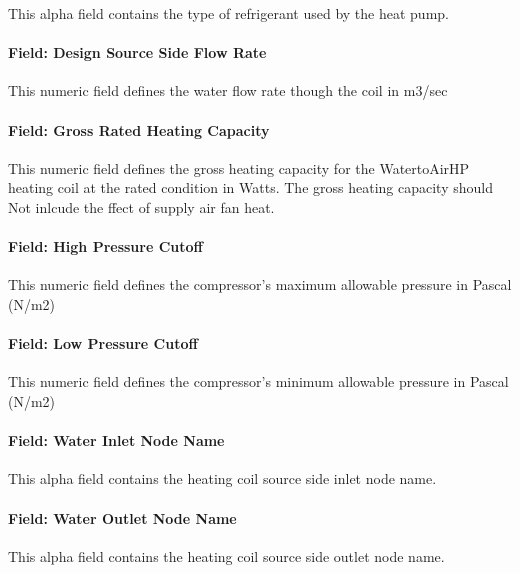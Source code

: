 This alpha field contains the type of refrigerant used by the heat pump.

\paragraph{Field: Design Source Side Flow Rate}\label{field-design-source-side-flow-rate-1}

This numeric field defines the water flow rate though the coil in m3/sec

\paragraph{Field: Gross Rated Heating Capacity}\label{field-gross-rated-heating-capacity-3}

This numeric field defines the gross heating capacity for the WatertoAirHP heating coil at the rated condition in Watts. The gross heating capacity should Not inlcude the ffect of supply air fan heat.

\paragraph{Field: High Pressure Cutoff}\label{field-high-pressure-cutoff-1}

This numeric field defines the compressor's maximum allowable pressure in Pascal (N/m2)

\paragraph{Field: Low Pressure Cutoff}\label{field-low-pressure-cutoff-1}

This numeric field defines the compressor's minimum allowable pressure in Pascal (N/m2)

\paragraph{Field: Water Inlet Node Name}\label{field-water-inlet-node-name-8}

This alpha field contains the heating coil source side inlet node name.

\paragraph{Field: Water Outlet Node Name}\label{field-water-outlet-node-name-8}

This alpha field contains the heating coil source side outlet node name.

